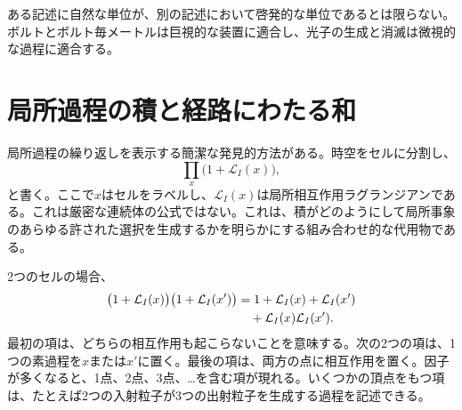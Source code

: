 \begin{classroomqa}
\end{classroomqa}

ある記述に自然な単位が、別の記述において啓発的な単位であるとは限らない。ボルトとボルト毎メートルは巨視的な装置に適合し、光子の生成と消滅は微視的な過程に適合する。

\begin{classroomqa}
\end{classroomqa}

\section{局所過程の積と経路にわたる和}

局所過程の繰り返しを表示する簡潔な発見的方法がある。時空をセルに分割し、
\begin{equation}
\prod_x\bigl(1+\mathcal L_I(x)\bigr),
\end{equation}
と書く。ここで\(x\)はセルをラベルし、\(\mathcal L_I(x)\)は局所相互作用ラグランジアンである。これは厳密な連続体の公式ではない。これは、積がどのようにして局所事象のあらゆる許された選択を生成するかを明らかにする組み合わせ的な代用物である。

\begin{classroomqa}
\end{classroomqa}

2つのセルの場合、
\begin{align}
\bigl(1+\mathcal L_I(x)\bigr)
\bigl(1+\mathcal L_I(x')\bigr)
&=
1+\mathcal L_I(x)+\mathcal L_I(x')
\notag\\
&\quad{}+\mathcal L_I(x)\mathcal L_I(x').
\end{align}
最初の項は、どちらの相互作用も起こらないことを意味する。次の2つの項は、1つの素過程を\(x\)または\(x'\)に置く。最後の項は、両方の点に相互作用を置く。因子が多くなると、1点、2点、3点、…を含む項が現れる。いくつかの頂点をもつ項は、たとえば2つの入射粒子が3つの出射粒子を生成する過程を記述できる。

